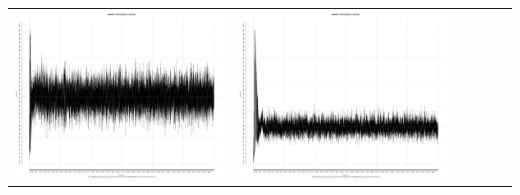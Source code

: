 \begin{table}[htbp]
{\begin{tabular}{l | ccccc}
\begin{minipage}{.15\textwidth}
     			 	\includegraphics[width=\linewidth]{images/mema-triple/I9}
    				 \end{minipage}
    			   &	 \begin{minipage}{.15\textwidth}
     			 	\includegraphics[width=\linewidth]{images/mema-triple/I12}
    				 \end{minipage}
    			   &	 \begin{minipage}{.15\textwidth}

\end{minipage}
\end{tabular}}
\end{table}
